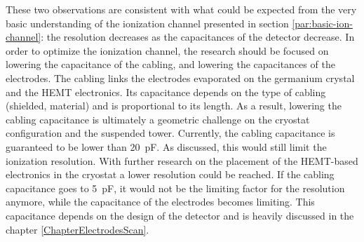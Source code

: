 These two observations are consistent with what could be expected from the very basic understanding of the ionization channel presented in section \ref{par:basic-ion-channel}: the resolution decreases as the capacitances of the detector decrease. 
In order to optimize the ionization channel, the research should be focused on lowering the capacitance of the cabling, and lowering the capacitances of the electrodes.
The cabling links the electrodes evaporated on the germanium crystal and the HEMT electronics. Its capacitance depends on the type of cabling (shielded, material) and is proportional to its length. As a result, lowering the cabling capacitance is ultimately a geometric challenge on the cryostat configuration and the suspended tower. Currently, the cabling capacitance is guaranteed to be lower than \SI{20}{\pico\farad}. As discussed, this would still limit the ionization resolution. With further research on the placement of the HEMT-based electronics in the cryostat a lower resolution could be reached. If the cabling capacitance goes to \SI{5}{\pico\farad}, it would not be the limiting factor for the resolution anymore, while the capacitance of the electrodes becomes limiting. This capacitance depends on the design of the detector and is heavily discussed in the chapter \ref{ChapterElectrodesScan}.
